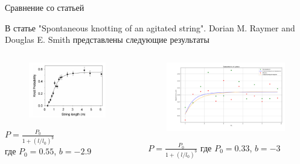 \begin{frame}{Сравнение со статьей}

	\begin{block}{}
		В статье "Spontaneous knotting of an agitated string". Dorian M. Raymer and Douglas E. Smith представлены следующие результаты
	\end{block}

	\begin{columns}

		\begin{column}{0.4\linewidth}
			\begin{figure}[H]
				\includegraphics[width=1\linewidth]{img/knot_prob.png}
			\end{figure}
			$P = \frac{P_0}{1+(l/l_0)^b}$
			\\где $P_0 = 0.55$, $b = -2.9$
		\end{column}

		\begin{column}{0.6\linewidth}
			\begin{figure}[H]
				\includegraphics[width=1\linewidth]{img/both_7.png}
			\end{figure}
			$\, \, \, \, P = \frac{P_0}{1+(l/l_0)^b}$
			где $P_0 = 0.33$, $b = -3$
		\end{column}


	\end{columns}

\end{frame}

